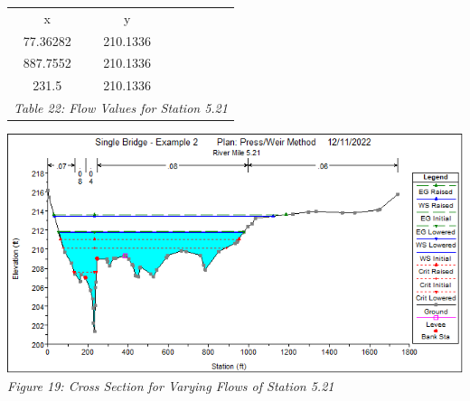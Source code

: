 \begin{center}
\begin{tabular}{|cc|cc|cc|}
            \cline{1-2}
            x        & y                                             &          &                                            &          &                                             \\
            77.36282 & 210.1336                                      &          &                                            &          &                                             \\
            887.7552 & 210.1336                                      &          &                                            &          &                                             \\
            231.5    & 210.1336                                      &          &                                            &          &                                             \\
            \hline\multicolumn{6}{c}{\emph{Table 22: Flow Values for Station 5.21}}
            \end{tabular}
            \vspace{5mm}
            \begin{center}
                \includegraphics[scale=0.7, frame]{fig19.png}
                \\\emph{Figure 19: Cross Section for Varying Flows of Station 5.21}\\
            \end{center}
            \newpage
        \end{center}
